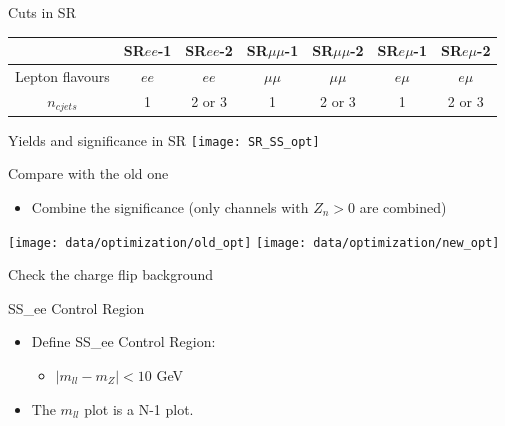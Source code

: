\documentclass[mathserif,serif]{beamer}
\begin{document}
\begin{frame}{Cuts in SR}
\vspace{5mm}
\tiny
\begin{tabular}{|c|c|c|c|c|c|c|}
\hline
& SR$ee$-1 & SR$ee$-2 & SR$\mu\mu$-1 & SR$\mu\mu$-2 & SR$e\mu$-1 & SR$e\mu$-2 \\
\hline
Lepton flavours & $ee$ & $ee$ & $\mu\mu$ & $\mu\mu$ & $e\mu$ & $e\mu$ \\
\hline
$n_{cjets}$ & 1 & 2 or 3 & 1 & 2 or 3 & 1 & 2 or 3 \\
\hline

\end{tabular}
\end{frame}

\begin{frame}{Yields and significance in SR}
\texttt{[image: SR\_SS\_opt]}
\end{frame}




\begin{frame}{Compare with the old one}
\begin{itemize}
\item Combine the significance (only channels with $Z_n>0$ are combined)
\end{itemize}
\texttt{[image: data/optimization/old\_opt]}
\texttt{[image: data/optimization/new\_opt]}
\end{frame}

\begin{frame}
\begin{center}
\huge
Check the charge flip background
\end{center}
\end{frame}

\begin{frame}{SS\_ee Control Region}
\begin{itemize}
\item Define SS\_ee Control Region:
\begin{itemize}
\item $|m_{ll}-m_Z| < 10$ GeV
\end{itemize}
\item The $m_{ll}$ plot is a N-1 plot.
\end{itemize}
\end{frame}



\end{document}
